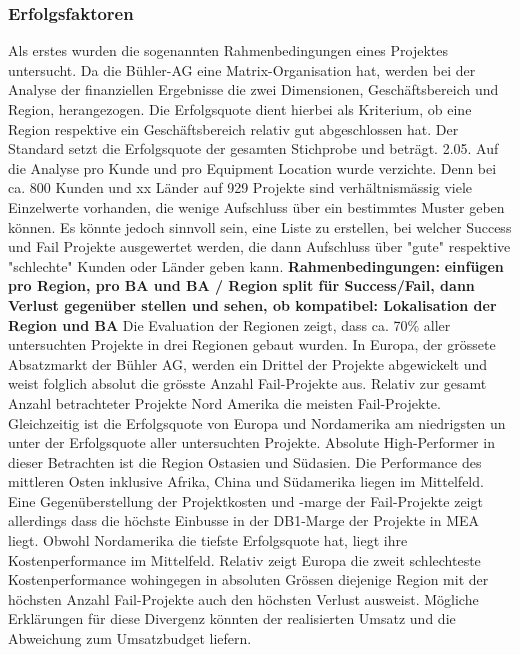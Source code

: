 \subsubsection{Erfolgsfaktoren}
Als erstes wurden die sogenannten Rahmenbedingungen eines Projektes untersucht. Da die Bühler-AG eine Matrix-Organisation hat, werden bei der Analyse der finanziellen Ergebnisse die zwei Dimensionen, Geschäftsbereich und Region, herangezogen. Die Erfolgsquote dient hierbei als Kriterium, ob eine Region respektive ein Geschäftsbereich relativ gut abgeschlossen hat. Der Standard setzt die Erfolgsquote der gesamten Stichprobe und beträgt. 2.05. Auf die Analyse pro Kunde und pro Equipment Location wurde verzichte. Denn bei ca. 800 Kunden und xx Länder auf 929 Projekte sind verhältnismässig viele Einzelwerte vorhanden, die wenige Aufschluss über ein bestimmtes Muster geben können. Es könnte jedoch sinnvoll sein, eine Liste zu erstellen, bei welcher Success und Fail Projekte ausgewertet werden, die dann Aufschluss über "gute" respektive "schlechte" Kunden oder Länder geben kann.
\textbf{Rahmenbedingungen:}
\newline \textbf{einfügen pro Region, pro BA und BA / Region split für Success/Fail, dann Verlust gegenüber stellen und sehen, ob kompatibel: Lokalisation der Region und BA}
\newline Die Evaluation der Regionen zeigt, dass ca. 70\% aller untersuchten Projekte in drei Regionen gebaut wurden. In Europa, der grössete Absatzmarkt der Bühler AG, werden ein Drittel der Projekte abgewickelt und weist folglich absolut die grösste Anzahl Fail-Projekte aus. Relativ zur gesamt Anzahl betrachteter Projekte   Nord Amerika die meisten Fail-Projekte. Gleichzeitig ist die Erfolgsquote von Europa und Nordamerika am niedrigsten un unter der Erfolgsquote aller untersuchten Projekte. Absolute High-Performer in dieser Betrachten ist die Region Ostasien und Südasien. Die Performance des mittleren Osten inklusive Afrika, China und Südamerika liegen im Mittelfeld. Eine Gegenüberstellung der Projektkosten und -marge der Fail-Projekte zeigt allerdings dass die höchste Einbusse in der DB1-Marge der Projekte in MEA liegt. Obwohl Nordamerika die tiefste Erfolgsquote hat, liegt ihre Kostenperformance im Mittelfeld. Relativ zeigt Europa die zweit schlechteste Kostenperformance wohingegen in absoluten Grössen diejenige Region mit der höchsten Anzahl Fail-Projekte auch den höchsten Verlust ausweist. Mögliche Erklärungen für diese Divergenz könnten der realisierten Umsatz und die Abweichung zum Umsatzbudget liefern. 

